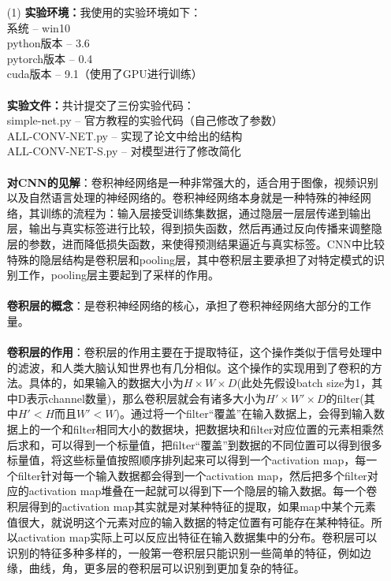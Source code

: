 \documentclass[a4paper,UTF8]{article}
\numberwithin{equation}{section}
\begin{document}
\begin{enumerate}
\item [(1)]
\textbf{实验环境：}我使用的实验环境如下：\\
系统 -- win10\\
python版本 -- 3.6\\
pytorch版本 -- 0.4\\
cuda版本 -- 9.1（使用了GPU进行训练）\\\\
\textbf{实验文件：}共计提交了三份实验代码：\\
simple-net.py -- 官方教程的实验代码（自己修改了参数）\\
ALL-CONV-NET.py -- 实现了论文中给出的结构\\
ALL-CONV-NET-S.py -- 对模型进行了修改简化\\\\
\textbf{对CNN的见解}：卷积神经网络是一种非常强大的，适合用于图像，视频识别以及自然语言处理的神经网络的。卷积神经网络本身就是一种特殊的神经网络，其训练的流程为：输入层接受训练集数据，通过隐层一层层传递到输出层，输出与真实标签进行比较，得到损失函数，然后再通过反向传播来调整隐层的参数，进而降低损失函数，来使得预测结果逼近与真实标签。CNN中比较特殊的隐层结构是卷积层和pooling层，其中卷积层主要承担了对特定模式的识别工作，pooling层主要起到了采样的作用。\\\\
\textbf{卷积层的概念}：是卷积神经网络的核心，承担了卷积神经网络大部分的工作量。\\\\
\textbf{卷积层的作用}：卷积层的作用主要在于提取特征，这个操作类似于信号处理中的滤波，和人类大脑认知世界也有几分相似。这个操作的实现用到了卷积的方法。具体的，如果输入的数据大小为$H\times W\times D$(此处先假设batch size为1，其中D表示channel数量)，那么卷积层就会有诸多大小为$H'\times W'\times D$的filter(其中$H' < H$而且$W' < W$)。通过将一个filter“覆盖”在输入数据上，会得到输入数据上的一个和filter相同大小的数据块，把数据块和filter对应位置的元素相乘然后求和，可以得到一个标量值，把filter“覆盖”到数据的不同位置可以得到很多标量值，将这些标量值按照顺序排列起来可以得到一个activation map，每一个filter针对每一个输入数据都会得到一个activation map，然后把多个filter对应的activation map堆叠在一起就可以得到下一个隐层的输入数据。每一个卷积层得到的activation map其实就是对某种特征的提取，如果map中某个元素值很大，就说明这个元素对应的输入数据的特定位置有可能存在某种特征。所以activation map实际上可以反应出特征在输入数据集中的分布。卷积层可以识别的特征多种多样的，一般第一卷积层只能识别一些简单的特征，例如边缘，曲线，角，更多层的卷积层可以识别到更加复杂的特征。\\\\

\end{enumerate}
\end{document}
